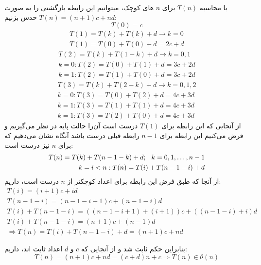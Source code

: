 \documentclass[]{article}
\begin{document}
با محاسبه $T(n)$ برای $n$ های کوچک، میتوانیم این رابطه بازگشتی را به صورت
$T(n) = (n+1)c + nd$ حدس بزنیم:
\begin{equation}
    T(0) = c
\end{equation}
\begin{equation}
\begin{split}
    T(1) = T(k) + T(k) + d \rightarrow k=0 \\
    T(1) = T(0) + T(0) + d = 2c + d
\end{split}
\end{equation} 
\begin{equation}
\begin{split}
    T(2) = T(k) + T(1 - k) + d \rightarrow k=0,1 \\
    k=0: T(2) = T(0) + T(1) + d = 3c + 2d \\
    k=1: T(2) = T(1) + T(0) + d = 3c + 2d
\end{split}
\end{equation} 
\begin{equation}
\begin{split}
    T(3) = T(k) + T(2 - k) + d \rightarrow k=0,1,2 \\
    k=0: T(3) = T(0) + T(2) + d = 4c + 3d \\
    k=1: T(3) = T(1) + T(1) + d = 4c + 3d \\
    k=1: T(3) = T(2) + T(0) + d = 4c + 3d
\end{split}
\end{equation}
از آنجایی که این رابطه برای $T(1)$ درست است آن‌را حالت پایه در نظر می‌گیریم
و فرض می‌کنیم این رابطه برای $n-1$ رابطه قبلی درست باشد آنگاه نشان می‌دهیم که برای $n$ نیز درست است:
\begin{align}
    T(n) = T(k) + T(n - 1 - k) + d ; \hspace{0.25cm} k=0,1, \dots, n-1 \\
    k=i < n: T(n) = T(i) + T(n - 1 - i) + d
\end{align}
از آنجا که طبق فرض این رابطه برای اعداد کوچکتر از $n$ درست است، داریم:
\begin{align}
    T(i) = (i+1)c + id \\
    T(n-1-i) = (n-1-i+1)c + (n-1-i)d \\
    T(i) + T(n-1-i) = ((n-1-i+1)+(i+1))c + ((n-1-i) + i)d \\
    T(i) + T(n-1-i) = (n+1)c + (n-1)d \\
    \Rightarrow T(n) = T(i) + T(n-1-i) + d = (n+1)c + nd
\end{align}

بنابراین حکم ثابت شد و از آنجایی که $c$ و $d$ اعداد ثابت اند، داریم:
$$T(n) = (n+1)c + nd = (c+d)n + c \Rightarrow T(n) \in \theta(n)$$
\end{document}
